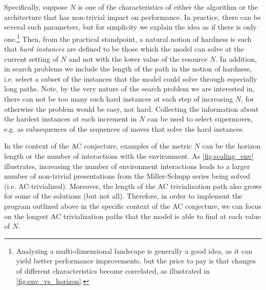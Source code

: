 Specifically, suppose $N$ is one of the characteristics of either the algorithm or the architecture that has non-trivial impact on performance. In practice, there can be several such parameters, but for simplicity we explain the idea as if there is only one.\footnote{Analyzing a multi-dimensional landscape is generally a good idea, as it can yield better performance improvements, but the price to pay is that changes of different characteristics become correlated, as illustrated in \autoref{fig:env_vs_horizon}.} Then, from the practical standpoint, a natural notion of hardness is such that \textit{hard instances} are defined to be those which the model can solve at the current setting of $N$ and not with the lower value of the resource $N$. In addition, in search problems we include the length of the path in the notion of hardness, i.e. select a subset of the instances that the model could solve through especially long paths. Note, by the very nature of the search problem we are interested in, there can not be too many such hard instances at each step of increasing $N$, for otherwise the problem would be easy, not hard. Collecting the information about the hardest instances at each increment in $N$ can be used to select supermoves, e.g. as subsequences of the sequences of moves that solve the hard instances.

In the context of the AC conjecture, examples of the metric $N$ can be the horizon length or the number of interactions with the environment. As \autoref{fig:scaling_env} illustrates, increasing the number of environment interactions leads to a larger number of non-trivial presentations from the Miller-Schupp series being solved (i.e. AC-trivialized). Moreover, the length of the AC trivialization path also grows for some of the solutions (but not all).
%
Therefore, in order to implement the program outlined above in the specific context of the AC conjecture, we can focus on the longest AC trivialization paths that the model is able to find at each value of $N$.


